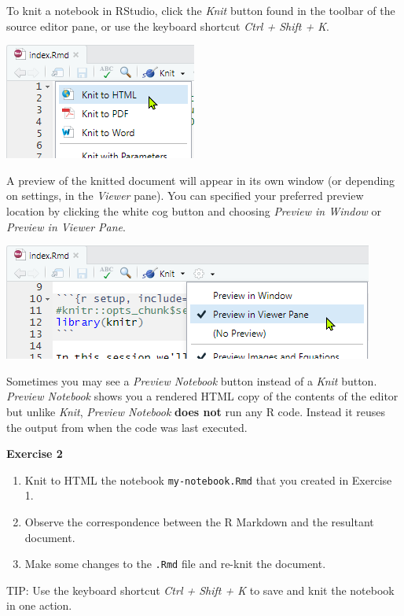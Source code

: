 \documentclass[]{article}
\providecommand{\tightlist}{%
  \setlength{\itemsep}{0pt}\setlength{\parskip}{0pt}}
\begin{document}
To knit a notebook in RStudio, click the \emph{Knit} button found in the
toolbar of the source editor pane, or use the keyboard shortcut
\emph{Ctrl + Shift + K}.

\includegraphics{./knitnotebook.png}

A preview of the knitted document will appear in its own window (or
depending on settings, in the \emph{Viewer} pane). You can specified
your preferred preview location by clicking the white cog button and
choosing \emph{Preview in Window} or \emph{Preview in Viewer Pane}.

\includegraphics{./previewinviewer.png}

Sometimes you may see a \emph{Preview Notebook} button instead of a
\emph{Knit} button. \emph{Preview Notebook} shows you a rendered HTML
copy of the contents of the editor but unlike \emph{Knit}, \emph{Preview
Notebook} \textbf{does not} run any R code. Instead it reuses the output
from when the code was last executed.

\textbf{Exercise 2}

\begin{enumerate}
\def\labelenumi{\arabic{enumi}.}
\tightlist
\item
  Knit to HTML the notebook \texttt{my-notebook.Rmd} that you created in
  Exercise 1.
\item
  Observe the correspondence between the R Markdown and the resultant
  document.
\item
  Make some changes to the \texttt{.Rmd} file and re-knit the document.
\end{enumerate}

TIP: Use the keyboard shortcut \emph{Ctrl + Shift + K} to save and knit
the notebook in one action.
\end{document}
